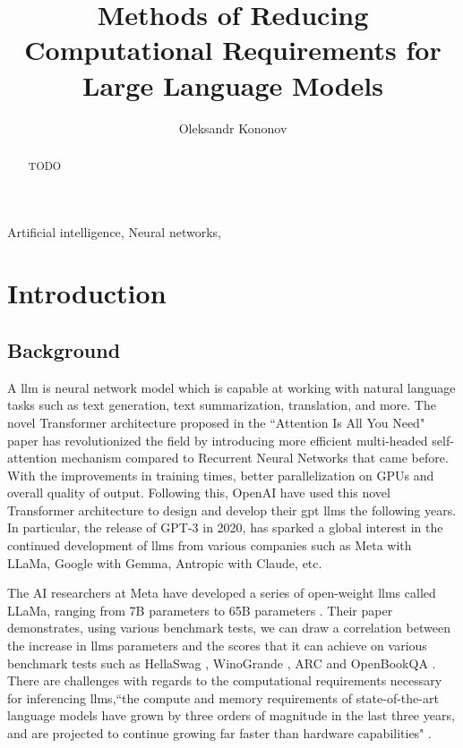 \documentclass{ifacconf}
\begin{document}
	
	\begin{frontmatter}
		
		\title{Methods of Reducing Computational Requirements for Large Language Models} 
		
		\author[First]{Oleksandr Kononov} 
		
		\address[First]{South East Technological University, 
			Cork Road, Waterford, Ireland (e-mail: 20071032@mail.wit.ie).}
		\begin{abstract}                %
			TODO
		\end{abstract}
		
		\begin{keyword}
			Artificial intelligence, Neural networks, 
		\end{keyword}
		
	\end{frontmatter}
	\section{Introduction}
	\subsection{Background}
	A \gls{llm} is neural network model which is capable at working with natural language tasks such as text generation, text summarization, translation, and more. The novel Transformer architecture proposed in the ``Attention Is All You Need" paper \cite{vaswani2017attentionneed} has revolutionized the field by introducing more efficient multi-headed self-attention mechanism compared to Recurrent Neural Networks that came before. With the improvements in training times, better parallelization on GPUs and overall quality of output.
	Following this, OpenAI have used this novel Transformer architecture to design and develop their \gls{gpt} \glspl{llm} the following years. In particular, the release of GPT-3 in 2020, has sparked a global interest in the continued development of \glspl{llm} from various companies such as Meta with LLaMa, Google with Gemma, Antropic with Claude, etc.
	
	The AI researchers at Meta have developed a series of open-weight \glspl{llm} called LLaMa, ranging from 7B parameters to 65B parameters \cite{touvron2023llamaopenefficientfoundation}. Their paper demonstrates, using various benchmark tests, we can draw a correlation between the increase in \glspl{llm} parameters and the scores that it can achieve on various benchmark tests such as HellaSwag \cite{zellers2019hellaswagmachinereallyfinish}, WinoGrande \cite{sakaguchi2019winograndeadversarialwinogradschema}, ARC \cite{clark2018thinksolvedquestionanswering} and OpenBookQA \cite{mihaylov2018suitarmorconductelectricity}. There are challenges with regards to the computational requirements necessary for inferencing \glspl{llm},``the compute and memory requirements of state-of-the-art language models have grown by three orders of magnitude in the last three years, and are projected to continue growing far faster than hardware capabilities" \cite[p.~97]{bommasani2022opportunitiesrisksfoundationmodels}.
	
\end{document}
